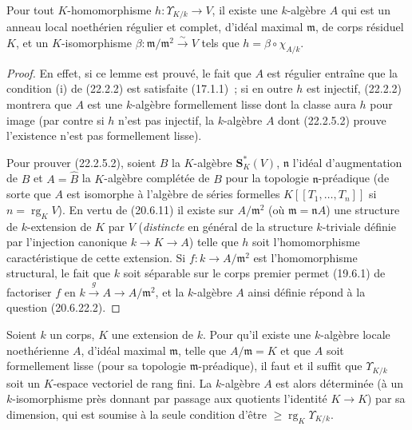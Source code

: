 \begin{lemma}[22.2.5.2]
\label{0.22.2.5.2-fr}
Pour tout $K$-homomorphisme $h:\Upsilon_{K/k}\to V$, il existe une
$k$-algèbre $A$ qui est un anneau local noethérien régulier et complet,
d'idéal maximal $\mathfrak m$, de corps résiduel $K$, et un $K$-isomorphisme
$\beta:\mathfrak m/\mathfrak m^2\xrightarrow{\sim}V$ tels que
$h=\beta\circ\chi_{A/k}$.
\end{lemma}

\begin{proof}
En effet, si ce lemme est prouvé, le fait que $A$ est régulier entraîne que
la condition (i) de (22.2.2) est satisfaite (17.1.1)~; si en outre $h$ est
injectif, (22.2.2) montrera que $A$ est une $k$-algèbre formellement lisse
dont la classe aura $h$ pour image (par contre si $h$ n'est pas injectif, la
$k$-algèbre $A$ dont (22.2.5.2) prouve l'existence n'est pas formellement
lisse).

Pour prouver (22.2.5.2), soient $B$ la $K$-algèbre $\mathbf S_K^*(V)$,
$\mathfrak n$ l'idéal d'augmentation de $B$ et $A=\widehat B$ la
$K$-algèbre complétée de $B$ pour la topologie $\mathfrak n$-préadique (de
sorte que $A$ est isomorphe à l'algèbre de séries formelles
$K[[T_1,\ldots,T_n]]$ si $n=\operatorname{rg}_KV$). En vertu de (20.6.11)
il existe sur $A/\mathfrak m^2$ (où $\mathfrak m=\mathfrak nA$) une structure
de $k$-extension de $K$ par $V$ (\emph{distincte} en général de la structure
$k$-triviale définie par l'injection canonique $k\to K\to A$) telle que $h$
soit l'homomorphisme caractéristique de cette extension. Si
$f:k\to A/\mathfrak m^2$ est l'homomorphisme structural, le fait que $k$
soit séparable sur le corps premier permet (19.6.1) de factoriser $f$ en
$k\xrightarrow{g}A\to A/\mathfrak m^2$, et la $k$-algèbre $A$ ainsi définie
répond à la question (20.6.22.2).
\end{proof}

\begin{theorem}[22.2.6]
\label{0.22.2.6-fr}
Soient $k$ un corps, $K$ une extension de $k$. Pour qu'il existe une
$k$-algèbre locale noethérienne $A$, d'idéal maximal $\mathfrak m$, telle que
$A/\mathfrak m=K$ et que $A$ soit formellement lisse (pour sa topologie
$\mathfrak m$-préadique), il faut et il suffit que $\Upsilon_{K/k}$ soit un
$K$-espace vectoriel de rang fini. La $k$-algèbre $A$ est alors déterminée
(à un $k$-isomorphisme près donnant par passage aux quotients l'identité
$K\to K$) par sa dimension, qui est soumise à la seule condition d'être
$\geqslant\operatorname{rg}_K\Upsilon_{K/k}$.
\end{theorem}


